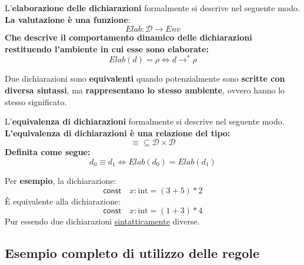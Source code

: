 \documentclass[a4paper]{article}
\begin{document}
	\begin{boxdef}
		L'\textcolor{Red3}{\textbf{elaborazione delle dichiarazioni}} formalmente si descrive nel seguente modo. \textbf{La valutazione è una funzione}:
		\begin{equation*}
			Elab: \mathcal{D} \longrightarrow Env
		\end{equation*}
		\textbf{Che descrive il comportamento dinamico delle dichiarazioni restituendo l'ambiente in cui esse sono elaborate:}
		\begin{equation*}
			Elab\left(d\right) = \rho \iff d \longrightarrow^{*} \rho
		\end{equation*}
	\end{boxdef}\:\newline

	\noindent
	Due dichiarazioni sono \textbf{equivalenti} quando potenzialmente sono \textbf{scritte con diversa sintassi}, ma \textbf{rappresentano lo stesso ambiente}, ovvero hanno lo stesso significato.
	
	\begin{boxdef}
		L'\textcolor{Red3}{\textbf{equivalenza di dichiarazioni}} formalmente si descrive nel seguente modo. \textbf{L'equivalenza di dichiarazioni è una relazione del tipo:}
		\begin{equation*}
			\equiv \subseteq \mathcal{D} \times \mathcal{D}
		\end{equation*}
		\textbf{Definita come segue:}
		\begin{equation*}
			d_{0} \equiv d_{1} \iff Elab\left(d_{0}\right) = Elab\left(d_{1}\right)
		\end{equation*}
	\end{boxdef}\:\newline
	
	\noindent
	Per \textcolor{Green4}{\textbf{esempio}}, la dichiarazione:
	\begin{equation*}
		\mathsf{const} \hspace{1em} x: \mathrm{int} = \left(3+5\right)*2
	\end{equation*}
	È equivalente alla dichiarazione:
	\begin{equation*}
		\mathsf{const} \hspace{1em} x: \mathrm{int} = \left(1+3\right)*4
	\end{equation*}
	Pur essendo due dichiarazioni \underline{sintatticamente} diverse.\newpage
	
	\subsection{Esempio completo di utilizzo delle regole}
	
\end{document}
